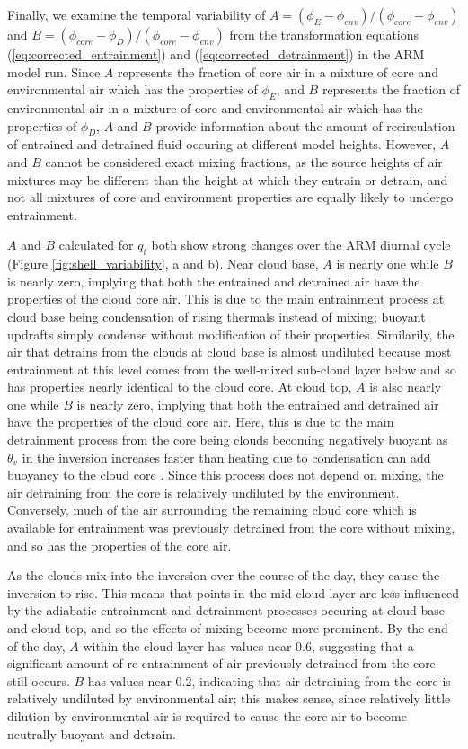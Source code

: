 \documentclass[12pt]{article}
\begin{document}
Finally, we examine the temporal variability of 
$A = (\phi_E - \phi_{env})/(\phi_{core} - \phi_{env})$ and
$B = (\phi_{core} - \phi_D)/(\phi_{core} - \phi_{env})$ from the 
transformation equations (\ref{eq:corrected_entrainment}) and 
(\ref{eq:corrected_detrainment}) in the ARM model run.  Since $A$ 
represents the fraction of core air in a mixture of core and environmental 
air which has the properties of $\phi_E$, and $B$ represents the fraction 
of environmental air in a mixture of core and environmental air which has 
the properties of $\phi_D$, $A$ and $B$ provide information about the 
amount of recirculation of entrained and detrained fluid occuring at 
different model heights.  However, $A$ and $B$ cannot be considered exact 
mixing fractions, as the source heights of air mixtures may be different 
than the height at which they entrain or detrain, and not all mixtures 
of core and environment properties are equally likely to undergo 
entrainment.

$A$ and $B$ calculated for $q_t$ both show strong changes over the ARM 
diurnal cycle (Figure \ref{fig:shell_variability}, a and b).  Near cloud 
base, $A$ is nearly one while $B$ is nearly zero, implying that both the 
entrained and detrained air have the properties of the cloud core air.  
This is due to the main entrainment process at cloud base being 
condensation of rising thermals instead of mixing; buoyant updrafts 
simply condense without modification of their properties.  Similarily, 
the air that detrains from the clouds at cloud base is almost undiluted 
because most entrainment at this level comes from the well-mixed 
sub-cloud layer below and so has properties nearly identical to the 
cloud core.  At cloud top, $A$ is also nearly one while $B$ is nearly 
zero, implying that both the entrained and detrained air have the 
properties of the cloud core air.  Here, this is due to the main 
detrainment process from the core being clouds becoming negatively 
buoyant as $\theta_v$ in the inversion increases faster than heating 
due to condensation can add buoyancy to the cloud core \citep{Wu2009}.  
Since this process does not depend on mixing, the air detraining from 
the core is relatively undiluted by the environment.  Conversely, much 
of the air surrounding the remaining cloud core which is available for 
entrainment was previously detrained from the core without mixing, and 
so has the properties of the core air.

As the clouds mix into the inversion over the course of the day, they 
cause the inversion to rise.  This means that points in the mid-cloud 
layer are less influenced by the adiabatic entrainment and detrainment 
processes occuring at cloud base and cloud top, and so the effects of 
mixing become more prominent.  By the end of the day, $A$ within the 
cloud layer has values near 0.6, suggesting that a significant amount 
of re-entrainment of air previously detrained from the core still occurs.  
$B$ has values near 0.2, indicating that air detraining from the core 
is relatively undiluted by environmental air; this makes sense, since 
relatively little dilution by environmental air is required to cause 
the core air to become neutrally buoyant and detrain.
\end{document}
